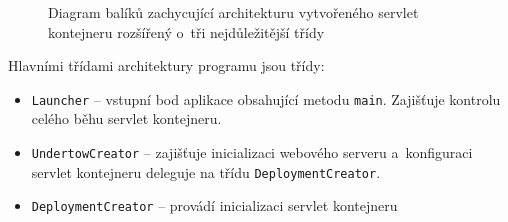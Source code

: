             \begin{figure}[h!t]
                \begin{center}
                    \caption{Diagram balíků zachycující architekturu vytvořeného servlet kontejneru rozšířený o~tři nejdůležitější třídy}
                    \label{imgPackage}
                \end{center}
            \end{figure}

            Hlavními třídami architektury programu jsou třídy:
            \begin{itemize}
                \item \texttt{Launcher} -- vstupní bod aplikace obsahující metodu \texttt{main}. 
                    Zajišťuje kontrolu celého běhu servlet kontejneru. 

                \item \texttt{UndertowCreator} -- zajišťuje inicializaci webového serveru
                    a~konfiguraci servlet kontejneru deleguje na třídu \texttt{DeploymentCreator}.

                \item \texttt{DeploymentCreator} -- provádí inicializaci servlet kontejneru 
            \end{itemize}


